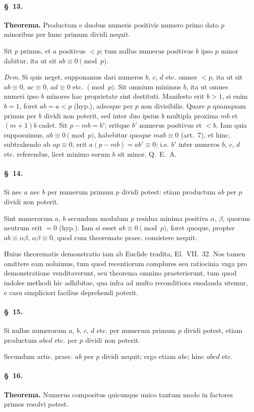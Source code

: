 \documentclass[12pt,a4paper]{article}
\theoremstyle{plain}
\theoremstyle{definition}
\theoremstyle{remark}
\newcommand{\art}[1]{\paragraph{\S\ #1.}}
\begin{document}
\art{13}
\textbf{Theorema.} Productum e duobus numeris positivis numero primo dato $p$ minoribus per hunc primum dividi nequit.

Sit $p$ primus, et $a$ positivus $< p$; tum nullus numerus positivus $b$ ipso $p$ minor dabitur, ita ut sit $ab \equiv 0 \pmod{p}$.

\emph{Dem.} Si quis neget, supponamus dari numeros $b$, $c$, $d$ etc. omnes $< p$, ita ut sit $ab \equiv 0$, $ac \equiv 0$, $ad \equiv 0$ etc. $\pmod{p}$. Sit omnium minimus $b$, ita ut omnes numeri ipso $b$ minores hac proprietate sint destituti. Manifesto erit $b > 1$, si enim $b = 1$, foret $ab = a < p$ (hyp.), adeoque per $p$ non divisibilis. Quare $p$ quamquam primus per $b$ dividi non poterit, sed inter duo ipsius $b$ multipla proxima $mb$ et $(m+1)b$ cadet. Sit $p - mb = b'$; eritque $b'$ numerus positivus et $< b$. Iam quia supposuimus, $ab \equiv 0 \pmod{p}$, habebitur quoque $mab \equiv 0$ (art.~7), et hinc, subtrahendo ab $ap \equiv 0$, erit $a(p - mb) = ab' \equiv 0$; i.e. $b'$ inter numeros $b$, $c$, $d$ etc. referendus, licet minimo eorum $b$ sit minor. \hfill Q.~E.~A.

\art{14}
Si nec $a$ nec $b$ per numerum primum $p$ dividi potest: etiam productum $ab$ per $p$ dividi non poterit.

Sint numerorum $a$, $b$ secundum modulum $p$ residua minima positiva $\alpha$, $\beta$, quorum neutrum erit $= 0$ (hyp.). Iam si esset $ab \equiv 0 \pmod{p}$, foret quoque, propter $ab \equiv \alpha\beta$, $\alpha\beta \equiv 0$, quod cum theoremate praec. consistere nequit.

Huius theorematis demonstratio iam ab Euclide tradita, El.~VII.~32. Nos tamen omittere eam noluimus, tum quod recentiorum complures seu ratiocinia vaga pro demonstratione venditaverunt, seu theorema omnino praeterierunt, tum quod indoles methodi hic adhibitae, qua infra ad multo reconditiora enodanda utemur, e casu simpliciori facilius deprehendi poterit.

\art{15}
Si nullus numerorum $a$, $b$, $c$, $d$ etc. per numerum primum $p$ dividi potest, etiam productum $abcd$ etc. per $p$ dividi non poterit.

Secundum artic. praec. $ab$ per $p$ dividi nequit; ergo etiam $abc$; hinc $abcd$ etc.

\art{16}
\textbf{Theorema.} Numerus compositus quicunque unico tantum modo in factores primos resolvi potest.
\end{document}
